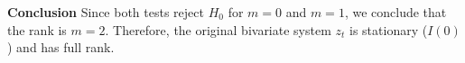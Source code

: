 \begin{frame}[allowframebreaks]
	\framebreak
	\textbf{Conclusion}
	Since both tests reject \(H_0\) for \(m=0\) and \(m=1\), we conclude that the rank is \(m=2\).  
	Therefore, the original bivariate system \(z_t\) is stationary (\(I(0)\)) and has full rank.
\end{frame}